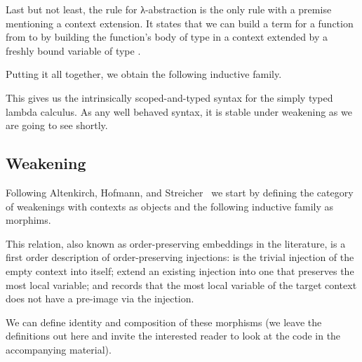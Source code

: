 \documentclass{article}
\begin{document}
Last but not least, the rule for λ-abstraction is the only rule
with a premise mentioning a context extension. It states that
we can build a term for a function from  to  by
building the function's body of type  in a context extended
by a freshly bound variable of type .

\noindent
\begin{minipage}[t]{.5\textwidth}
\end{minipage}\hfill
\begin{minipage}[t]{.35\textwidth}
\begin{mathpar}
\end{mathpar}
\end{minipage}


Putting it all together, we obtain the following inductive family.

\begin{AgdaAlign}
\begin{AgdaSuppressSpace}
\end{AgdaSuppressSpace}
\end{AgdaAlign}

This gives us the intrinsically scoped-and-typed syntax for
the simply typed lambda calculus. As any well behaved syntax,
it is stable under weakening as we are going to see shortly.

\subsection{Weakening}

Following Altenkirch, Hofmann, and Streicher~\cite{DBLP:conf/ctcs/AltenkirchHS95}
we start by defining the category of weakenings with contexts
as objects and the following inductive family as morphims.


This relation, also known as order-preserving embeddings in the
literature, is a first order description of order-preserving
injections:
 is the trivial injection of the empty context into
itself;
 extend an existing injection into one that preserves
the most local variable;
and  records that the most local variable of the target
context does not have a pre-image via the injection.

We can define identity and composition of these morphisms (we leave
the definitions out here and invite the interested reader to look
at the code in the accompanying material).
\end{document}
